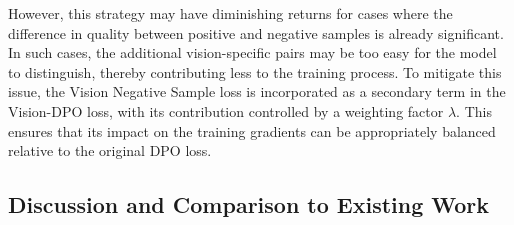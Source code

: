 However, this strategy may have diminishing returns for cases where the difference in quality between positive and negative samples is already significant. In such cases, the additional vision-specific pairs may be too easy for the model to distinguish, thereby contributing less to the training process. To mitigate this issue, the Vision Negative Sample loss is incorporated as a secondary term in the Vision-DPO loss, with its contribution controlled by a weighting factor $\lambda$. This ensures that its impact on the training gradients can be appropriately balanced relative to the original DPO loss.

\subsection{Discussion and Comparison to Existing Work}
